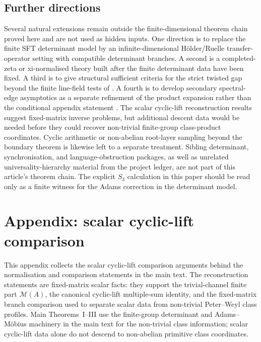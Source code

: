 \documentclass[11pt,a4paper]{amsart}
\theoremstyle{plain}
\theoremstyle{definition}
\theoremstyle{remark}
\begin{document}
\subsection{Further directions}

Several natural extensions remain outside the finite-dimensional theorem chain
proved here and are not used as hidden inputs.  One direction is to replace the
finite SFT determinant model by an infinite-dimensional H\"older/Ruelle
transfer-operator setting with compatible determinant branches.  A second is a
completed-zeta or xi-normalised theory built after the finite determinant data
have been fixed.  A third is to give structural sufficient criteria for the
strict twisted gap beyond the finite line-field tests of
.  A fourth is to develop
secondary spectral-edge asymptotics as a separate refinement of the product
expansion rather than the conditional appendix statement
.  The scalar cyclic-lift
reconstruction results suggest fixed-matrix inverse problems, but additional
descent data would be needed before they could recover non-trivial finite-group
class-product coordinates.  Cyclic arithmetic or non-abelian root-layer
sampling beyond the boundary theorem is likewise left to a separate treatment.
Sibling determinant, synchronisation, and language-obstruction packages, as
well as unrelated universality-hierarchy material from the project ledger, are
not part of this article's theorem chain.  The explicit \(S_3\) calculation in
this paper should be read only as a finite witness for the Adams correction in
the determinant model.
\appendix
\section{Appendix: scalar cyclic-lift comparison}
\label{app:cyclic-lift-comparison}

This appendix collects the scalar cyclic-lift comparison arguments behind the
normalisation and comparison statements in the main text.  The reconstruction
statements are fixed-matrix scalar facts: they support the trivial-channel
finite part \(\mathcal M(A)\), the canonical cyclic-lift multiple-sum identity,
and the fixed-matrix branch comparison used to separate scalar data from
non-trivial Peter--Weyl class profiles.  Main Theorems~I--III use the
finite-group determinant and Adams--M\"obius machinery in the main text for the
non-trivial class information; scalar cyclic-lift data alone do not descend to
non-abelian primitive class coordinates.
\end{document}
